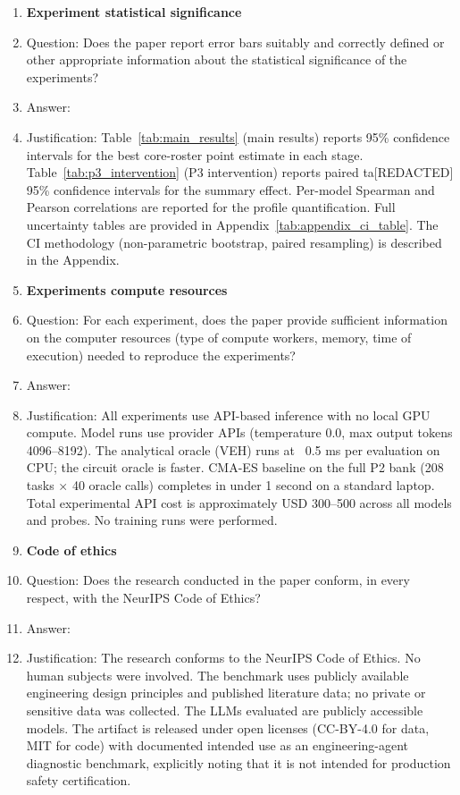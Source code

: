 \begin{enumerate}
\item {\bf Experiment statistical significance}
    \item[] Question: Does the paper report error bars suitably and correctly defined or other appropriate information about the statistical significance of the experiments?
    \item[] Answer: \answerYes{}
    \item[] Justification: Table~\ref{tab:main_results} (main results) reports 95\% confidence intervals for the best core-roster point estimate in each stage. Table~\ref{tab:p3_intervention} (P3 intervention) reports paired ta[REDACTED] 95\% confidence intervals for the summary effect. Per-model Spearman and Pearson correlations are reported for the profile quantification. Full uncertainty tables are provided in Appendix~\ref{tab:appendix_ci_table}. The CI methodology (non-parametric bootstrap, paired resampling) is described in the Appendix.

\item {\bf Experiments compute resources}
    \item[] Question: For each experiment, does the paper provide sufficient information on the computer resources (type of compute workers, memory, time of execution) needed to reproduce the experiments?
    \item[] Answer: \answerYes{}
\item[] Justification: All experiments use API-based inference with no local GPU compute. Model runs use provider APIs (temperature 0.0, max output tokens 4096--8192). The analytical oracle (VEH) runs at ~0.5 ms per evaluation on CPU; the circuit oracle is faster. CMA-ES baseline on the full P2 bank (208 tasks × 40 oracle calls) completes in under 1 second on a standard laptop. Total experimental API cost is approximately USD 300--500 across all models and probes. No training runs were performed.

\item {\bf Code of ethics}
    \item[] Question: Does the research conducted in the paper conform, in every respect, with the NeurIPS Code of Ethics?
    \item[] Answer: \answerYes{}
    \item[] Justification: The research conforms to the NeurIPS Code of Ethics. No human subjects were involved. The benchmark uses publicly available engineering design principles and published literature data; no private or sensitive data was collected. The LLMs evaluated are publicly accessible models. The artifact is released under open licenses (CC-BY-4.0 for data, MIT for code) with documented intended use as an engineering-agent diagnostic benchmark, explicitly noting that it is not intended for production safety certification.


\end{enumerate}
